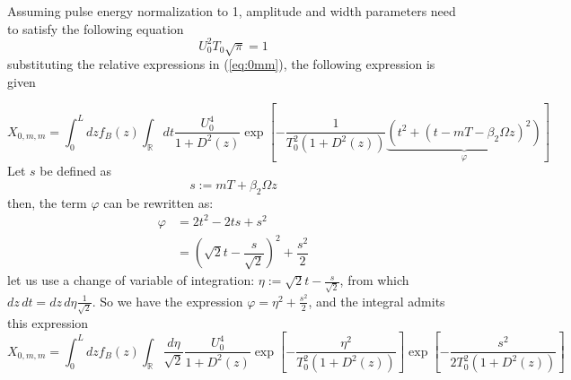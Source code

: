 \documentclass[10pt, lettersize, journal, onecolumn]{IEEEtran}
\begin{document}
Assuming pulse energy normalization to 1, amplitude and width parameters need to satisfy the following equation
\begin{equation}\label{eq:normie}
	U_0^2T_0 \sqrt{\pi} = 1
\end{equation}
substituting the relative expressions in (\ref{eq:0mm}), the following expression is given

\begin{equation}
	X_{0, m, m} = \int_{0}^{L}dz f_B(z) \int_{\mathbb{R}}dt \dfrac{U_0^4}{1+D^2(z)} \exp\left[-\dfrac{1}{T_0^2(1+D^2(z))} \underbrace{\left(t^2 + (t-mT-\beta_2\Omega z)^2\right)}_{\varphi}\right]
\end{equation}
Let $s$ be defined as
\begin{equation}
	s := mT+\beta_2\Omega z
\end{equation}
then, the term $\varphi$ can be rewritten as:
\begin{align}
	\varphi &= 2t^2 - 2ts + s^2 \\
	&= \left(\sqrt{2}t - \dfrac{s}{\sqrt{2}}\right)^2 + \dfrac{s^2}{2}
\end{align}
let us use a change of variable of integration: $\eta := \sqrt{2}t - \frac{s}{\sqrt{2}}$, from which $dz\,dt = dz\,d\eta \frac{1}{\sqrt{2}}$.
So we have the expression $\varphi = \eta^2 + \frac{s^2}{2}$, and the integral admits this expression
\begin{equation}
	X_{0, m, m} = \int_{0}^{L}dz f_B(z) \int_{\mathbb{R}}\dfrac{d\eta}{\sqrt{2}}
	\dfrac{U_0^4}{1+D^2(z)} \exp\left[-\dfrac{\eta^2}{T_0^2(1+D^2(z))} \right] \exp\left[-\dfrac{s^2}{2T_0^2(1+D^2(z))} \right]
\end{equation}
\end{document}
